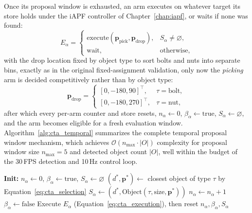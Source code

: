 Once its proposal window is exhausted, an arm executes on whatever target its store holds under the
iAPF controller of Chapter~\ref{chap:iapf}, or waits if none was found:
\begin{equation}
E_\alpha =
\begin{cases}
\text{execute}(\mathbf{p}_{\text{pick}}, \mathbf{p}_{\text{drop}}), & S_\alpha \neq \varnothing, \\
\text{wait}, & \text{otherwise},
\end{cases}
\label{eq:cta_execution}
\end{equation}
with the drop location fixed by object type to sort bolts and nuts into separate bins, exactly as
in the original fixed-assignment validation, only now the \emph{picking} arm is decided
competitively rather than by object type:
\begin{equation}
\mathbf{p}_{\text{drop}} =
\begin{cases}
[0, -180, 90]^\top, & \tau = \text{bolt}, \\
[0, -180, 270]^\top, & \tau = \text{nut},
\end{cases}
\label{eq:cta_dropzone}
\end{equation}
after which every per-arm counter and store resets, $n_\alpha \leftarrow 0$,
$\beta_\alpha \leftarrow \text{true}$, $S_\alpha \leftarrow \varnothing$, and the arm becomes
eligible for a fresh evaluation window. Algorithm~\ref{alg:cta_temporal} summarizes the complete
temporal proposal window mechanism, which achieves $\mathcal{O}(n_{\max} \cdot |O|)$ complexity for
proposal window size $n_{\max} = 5$ and detected object count $|O|$, well within the budget of the
30\,FPS detection and 10\,Hz control loop.

\begin{algorithm}[htbp]
\caption{Temporal Proposal Window Mechanism}
\label{alg:cta_temporal}
\begin{algorithmic}[1]
\STATE \textbf{Init:} $n_\alpha \leftarrow 0$, $\beta_\alpha \leftarrow \text{true}$, $S_\alpha \leftarrow \varnothing$
    \STATE $(d^*, \mathbf{p}^*) \leftarrow$ closest object of type $\tau$ by Equation~\eqref{eq:cta_selection}
                \STATE $S_\alpha \leftarrow (d^*, \text{Object}(\tau, \text{size}, \mathbf{p}^*))$
            \ENDIF
            \STATE $n_\alpha \leftarrow n_\alpha + 1$
        \ELSE
            \STATE $\beta_\alpha \leftarrow \text{false}$
        \ENDIF
    \ENDIF
\ENDFOR
{}
    \STATE Execute $E_\alpha$ (Equation~\eqref{eq:cta_execution}), then reset $n_\alpha, \beta_\alpha, S_\alpha$
\ENDIF
\end{algorithmic}
\end{algorithm}

